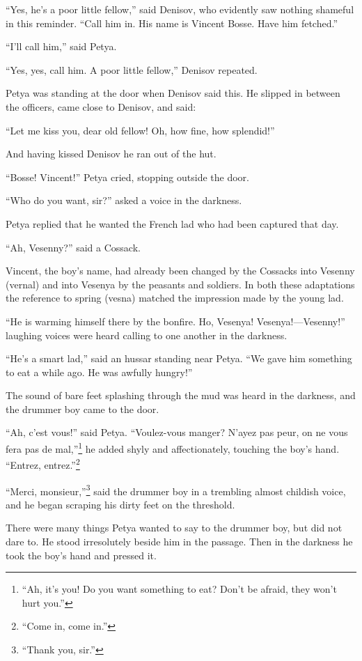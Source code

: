 ``Yes, he's a poor little fellow,'' said Denisov, who evidently
saw nothing shameful in this reminder. ``Call him in. His name is
Vincent Bosse. Have him fetched.''

``I'll call him,'' said Petya.

``Yes, yes, call him. A poor little fellow,'' Denisov repeated.

Petya was standing at the door when Denisov said this. He slipped
in between the officers, came close to Denisov, and said:

``Let me kiss you, dear old fellow! Oh, how fine, how splendid!''

And having kissed Denisov he ran out of the hut.

``Bosse! Vincent!'' Petya cried, stopping outside the door.

``Who do you want, sir?'' asked a voice in the darkness.

Petya replied that he wanted the French lad who had been captured
that day.

``Ah, Vesenny?'' said a Cossack.

Vincent, the boy's name, had already been changed by the Cossacks
into Vesenny (vernal) and into Vesenya by the peasants and
soldiers. In both these adaptations the reference to spring
(vesna) matched the impression made by the young lad.

``He is warming himself there by the bonfire. Ho, Vesenya!
Vesenya!---Vesenny!'' laughing voices were heard calling to one
another in the darkness.

``He's a smart lad,'' said an hussar standing near Petya. ``We
gave him something to eat a while ago. He was awfully hungry!''

The sound of bare feet splashing through the mud was heard in the
darkness, and the drummer boy came to the door.

``Ah, c'est vous!'' said Petya. ``Voulez-vous manger? N'ayez pas
peur, on ne vous fera pas de mal,''\footnote{``Ah, it's you! Do
you want something to eat? Don't be afraid, they won't hurt
you.''} he added shyly and affectionately, touching the boy's
hand. ``Entrez, entrez.''\footnote{``Come in, come in.''}

``Merci, monsieur,''\footnote{``Thank you, sir.''} said the
drummer boy in a trembling almost childish voice, and he began
scraping his dirty feet on the threshold.

There were many things Petya wanted to say to the drummer boy,
but did not dare to. He stood irresolutely beside him in the
passage. Then in the darkness he took the boy's hand and pressed
it.

